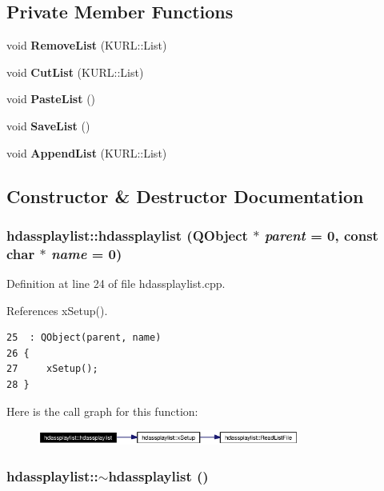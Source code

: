 \subsection*{Private Member Functions}
\begin{CompactItemize}
\item 
void {\bf Remove\-List} (KURL::List)
\item 
void {\bf Cut\-List} (KURL::List)
\item 
void {\bf Paste\-List} ()
\item 
void {\bf Save\-List} ()
\item 
void {\bf Append\-List} (KURL::List)
\end{CompactItemize}


\subsection{Constructor \& Destructor Documentation}
\subsubsection{\setlength{\rightskip}{0pt plus 5cm}hdassplaylist::hdassplaylist (QObject $\ast$ {\em parent} = 0, const char $\ast$ {\em name} = 0)}\label{classhdassplaylist_hdassplaylista0}




Definition at line 24 of file hdassplaylist.cpp.

References x\-Setup().



\footnotesize\begin{verbatim}25  : QObject(parent, name)
26 {
27     xSetup();
28 }
\end{verbatim}\normalsize 


Here is the call graph for this function:\begin{figure}[H]
\begin{center}
\leavevmode
\includegraphics[width=244pt]{classhdassplaylist_hdassplaylista0_cgraph}
\end{center}
\end{figure}
\subsubsection{\setlength{\rightskip}{0pt plus 5cm}hdassplaylist::$\sim${\bf hdassplaylist} ()}\label{classhdassplaylist_hdassplaylista1}




